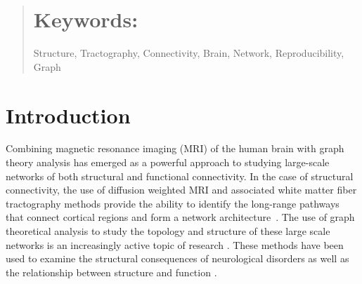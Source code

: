 \documentclass{frontiersSCNS} %
\begin{document}
\begin{abstract}

\tiny
  \section{Keywords:} Structure, Tractography, Connectivity, Brain, Network, Reproducibility, Graph  %
\end{abstract}


\section{Introduction}
Combining magnetic resonance imaging (MRI) of the human brain with graph
theory analysis has emerged as a powerful approach to studying
large-scale networks of both structural and functional
connectivity. In the case of structural connectivity, the use of diffusion weighted MRI and
associated white matter fiber tractography methods provide the ability to identify
the long-range pathways that connect cortical regions and form a
network architecture~\citep{Basser2000,Lazar2003,Hagmann2003,Xue1999}. 
The use of graph theoretical analysis to study
the topology and structure of these large scale networks is an 
increasingly active topic of research \citep{Hagmann2008,Zalesky2010,Cheng2012,Bastiani2012,Irimia2012N,Sporns2011,Fornito2012}.
These methods have been used to examine the structural consequences of neurological disorders \citep{Xie2012,Guye2010,Martin2012}
as well as the relationship between structure and function \citep{Hagmann2008,Honey2009,Honey2007}. 
\end{document}
